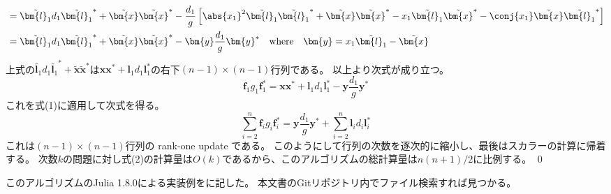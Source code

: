 \begin{derivation*}
\begin{align*}
                &= \tilde{\bm{l}_1}d_1\tilde{\bm{l}_1}^* + \tilde{\bm{x}}\tilde{\bm{x}}^* - \frac{d_1}{g}\left[\abs{x_1}^2\tilde{\bm{l}_1}\tilde{\bm{l}_1}^* + \tilde{\bm{x}}\tilde{\bm{x}}^* - x_1\tilde{\bm{l}_1}\tilde{\bm{x}}^* - \conj{x_1}\tilde{\bm{x}}\tilde{\bm{l}_1}^*\right] \\
                &= \tilde{\bm{l}_1}d_1\tilde{\bm{l}_1}^* + \tilde{\bm{x}}\tilde{\bm{x}}^* - \bm{y}\frac{d_1}{g}\bm{y}^* \quad \text{where} \quad \bm{y} = x_1\tilde{\bm{l}_1} - \tilde{\bm{x}}
            \end{align*}
            上式の$\tilde{\bm{l}_1}d_1\tilde{\bm{l}_1}^* + \tilde{\bm{x}}\tilde{\bm{x}}^*$は$\bm{x}\bm{x}^* + \bm{l}_1 d_1\bm{l}_1^*$の右下$(n-1)\times(n-1)$行列である。
            以上より次式が成り立つ。
            \[ \bm{f}_1 g_1\bm{f}_1^* = \bm{x}\bm{x}^* + \bm{l}_1 d_1\bm{l}_1^* - \bm{y}\frac{d_1}{g}\bm{y}^* \]
            これを式(1)に適用して次式を得る。
            \[ \sum_{i=2}^n \bm{f}_i g_i\bm{f}_i^* = \bm{y}\frac{d_1}{g}\bm{y}^* + \sum_{i=2}^n \bm{l}_i d_i\bm{l}_i^* \]
            これは$(n-1)\times(n-1)$行列の rank-one update である。
            このようにして行列の次数を逐次的に縮小し、最後はスカラーの計算に帰着する。
            次数$k$の問題に対し式(2)の計算量は$O(k)$であるから、このアルゴリズムの総計算量は$n(n+1)/2$に比例する。
            \qed
        \end{derivation*}
        このアルゴリズムのJulia 1.8.0による実装例をに記した。
        本文書のGitリポジトリ内でファイル検索すれば見つかる。
